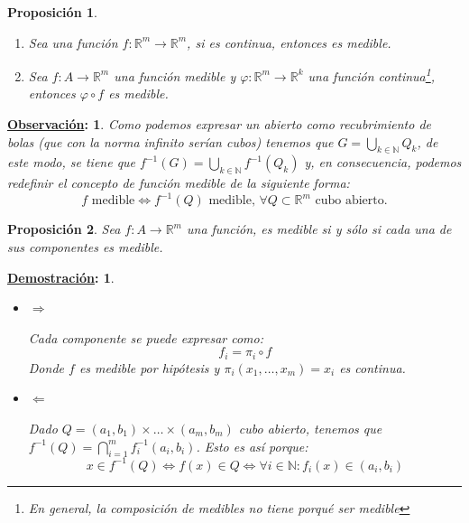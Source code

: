 \documentclass[10pt,a4paper,openright]{book}
\theoremstyle{break}
\newtheorem*{prop}{Proposición}
\newtheorem*{demo}{\underline{Demostración}:}
\newtheorem*{obs}{\underline{Observación}:}
\begin{document}
\begin{prop}
\begin{enumerate}
\item Sea una función $f: \mathbb{R}^m \rightarrow \mathbb{R}^m$, si es continua, entonces es medible.

\item Sea $f: A \rightarrow \mathbb{R}^m$ una función medible y $\varphi: \mathbb{R}^m \rightarrow \mathbb{R}^k$ una función continua\footnote{En general, la composición de medibles no tiene porqué ser medible}, entonces $\varphi \circ f$ es medible.
\end{enumerate}
\end{prop}

\begin{obs}
Como podemos expresar un abierto como recubrimiento de bolas (que con la norma infinito serían cubos) tenemos que $G = \bigcup_{k \in \mathbb{N}} Q_k$, de este modo, se tiene que $f^{-1}\left( G \right) = \bigcup_{k \in \mathbb{N}}f^{-1}\left( Q_k \right)$ y, en consecuencia, podemos redefinir el concepto de función medible de la siguiente forma:
$$f \text{ medible} \Leftrightarrow f^{-1}\left( Q \right) \text{ medible, } \forall Q \subset \mathbb{R}^m \text{ cubo abierto.}$$
\end{obs}


\begin{prop}
Sea $f: A \rightarrow \mathbb{R}^m$ una función, es medible si y sólo si cada una de sus componentes es medible.
\end{prop}
\begin{demo}
\begin{itemize}
\item $\Rightarrow$

Cada componente se puede expresar como:
$$f_i = \pi_i \circ f$$
Donde $f$ es medible por hipótesis y $\pi_i\left( x_1, \ldots, x_m \right) = x_i$ es continua.

\item $\Leftarrow$

Dado $Q = \left( a_1, b_1 \right) \times \ldots \times \left( a_m, b_m \right)$ cubo abierto, tenemos que $f^{-1}\left( Q \right) = \bigcap_{i = 1}^{m} f_i^{-1}\left( a_i, b_i \right)$. Esto es así porque:
$$x \in f^{-1}\left( Q \right) \Leftrightarrow f\left( x \right) \in Q \Leftrightarrow \forall i \in \mathbb{N} : f_i\left( x \right) \in \left( a_i, b_i \right)$$
\end{itemize}
\end{demo}
\end{document}
